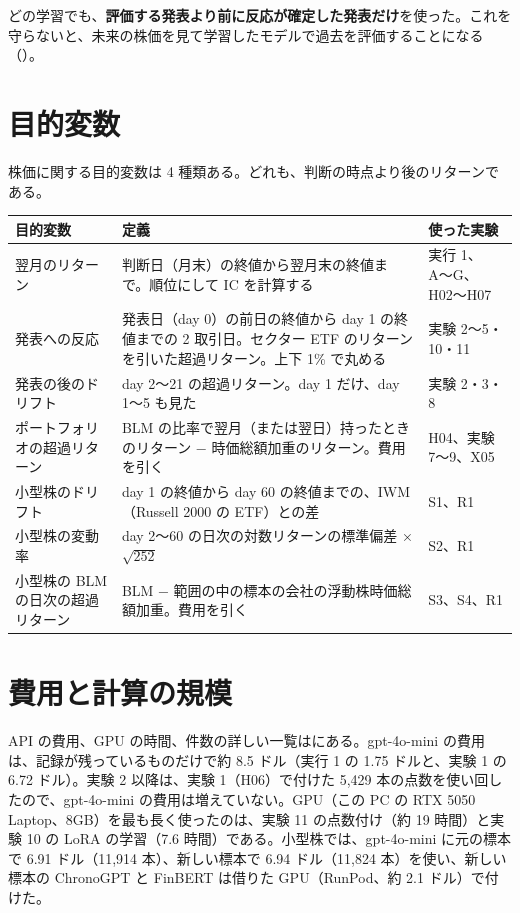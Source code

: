 どの学習でも、\textbf{評価する発表より前に反応が確定した発表だけ}を使った。これを守らないと、未来の株価を見て学習したモデルで過去を評価することになる（）。

\section{目的変数}

株価に関する目的変数は 4 種類ある。どれも、判断の時点より後のリターンである。

\begin{longtable}{P{4.0cm}P{6.2cm}P{4.4cm}}
\toprule
\textbf{目的変数} & \textbf{定義} & \textbf{使った実験} \\
\midrule
\endhead
\bottomrule
\endfoot
翌月のリターン & 判断日（月末）の終値から翌月末の終値まで。順位にして IC を計算する & 実行 1、A〜G、H02〜H07 \\
発表への反応 & 発表日（day 0）の前日の終値から day 1 の終値までの 2 取引日。セクター ETF のリターンを引いた超過リターン。上下 1\% で丸める & 実験 2〜5・10・11 \\
発表の後のドリフト & day 2〜21 の超過リターン。day 1 だけ、day 1〜5 も見た & 実験 2・3・8 \\
ポートフォリオの超過リターン & BLM の比率で翌月（または翌日）持ったときのリターン − 時価総額加重のリターン。費用を引く & H04、実験 7〜9、X05 \\
小型株のドリフト & day 1 の終値から day 60 の終値までの、IWM（Russell 2000 の ETF）との差 & S1、R1 \\
小型株の変動率 & day 2〜60 の日次の対数リターンの標準偏差 × $\sqrt{252}$ & S2、R1 \\
小型株の BLM の日次の超過リターン & BLM − 範囲の中の標本の会社の浮動株時価総額加重。費用を引く & S3、S4、R1 \\
\end{longtable}

\section{費用と計算の規模}

API の費用、GPU の時間、件数の詳しい一覧はにある。gpt-4o-mini の費用は、記録が残っているものだけで約 8.5 ドル（実行 1 の 1.75 ドルと、実験 1 の 6.72 ドル）。実験 2 以降は、実験 1（H06）で付けた 5,429 本の点数を使い回したので、gpt-4o-mini の費用は増えていない。GPU（この PC の RTX 5050 Laptop、8GB）を最も長く使ったのは、実験 11 の点数付け（約 19 時間）と実験 10 の LoRA の学習（7.6 時間）である。小型株では、gpt-4o-mini に元の標本で 6.91 ドル（11,914 本）、新しい標本で 6.94 ドル（11,824 本）を使い、新しい標本の ChronoGPT と FinBERT は借りた GPU（RunPod、約 2.1 ドル）で付けた。
